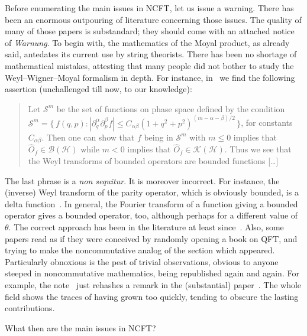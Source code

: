 \documentclass[a4paper,12pt]{article}
\renewcommand{\a}{\alpha}           %
\renewcommand{\b}{\beta}            %
\newcommand{\del}{\partial}         %
\renewcommand{\H}{\mathcal{H}}      %
\newcommand{\K}{\mathcal{K}}        %
\newcommand{\set}[1]{\{\,#1\,\}}     %
\renewcommand{\SS}{\mathcal{S}}     %
\newcommand{\1}{\mathbf{1}}         %
\newcommand{\7}{\dagger}            %
\newcommand{\8}{\bullet}            %
\renewcommand{\.}{\cdot}            %
\renewcommand{\:}{\colon}           %
\begin{document}
Before enumerating the main issues in NCFT, let us issue a warning.
There has been an enormous outpouring of literature concerning those
issues. The quality of many of those papers is substandard; they
should come with an attached notice of \textit{Warnung}. To begin
with, the mathematics of the Moyal product, as already said, antedates
its current use by string theorists. There has been no shortage of
mathematical mistakes, attesting that many people did not bother to
study the Weyl--Wigner--Moyal formalism in depth. For instance,
in~\cite{Harvey} we find the following assertion (unchallenged till
now, to our knowledge):
\begin{quotation}
Let $\SS^m$ be the set of functions on phase space defined by
the condition $\SS^m = \set{f(q,p) : |\del_q^\a \del_p^\b f|
\leq C_{\a\b} (1 + q^2 + p^2)^{(m-\a-\b)/2}}$, for constants
$C_{\a\b}$. Then one can show that $f$ being in $\SS^m$ with
$m \leq 0$ implies that $\hat O_f \in \mathcal{B}(\H)$ while $m < 0$
implies that $\hat O_f \in \K(\H)$. Thus we see that the Weyl
transforms of bounded operators are bounded functions [\dots]
\end{quotation}
The last phrase is a {\it non sequitur\/}. It is moreover incorrect.
For instance, the (inverse) Weyl transform of the parity operator,
which is obviously bounded, is a delta function~\cite{Iapetus}. In
general, the Fourier transform of a function giving a bounded operator
gives a bounded operator, too, although perhaps for a different value
of $\theta$. The correct approach has been in the literature at least
since~\cite{Phobos,Deimos}. Also, some papers read as if they were
conceived by randomly opening a book on QFT, and trying to make the
noncommutative analog of the section which appeared. Particularly
obnoxious is the pest of trivial observations, obvious to anyone
steeped in noncommutative mathematics, being republished again and
again. For example, the note~\cite{ChaichianPJTNogo} just rehashes a
remark in the (substantial) paper~\cite{Terashima}. The whole field
shows the traces of having grown too quickly, tending to obscure the
lasting contributions.

\smallskip
What then are the main issues in NCFT?
\end{document}
